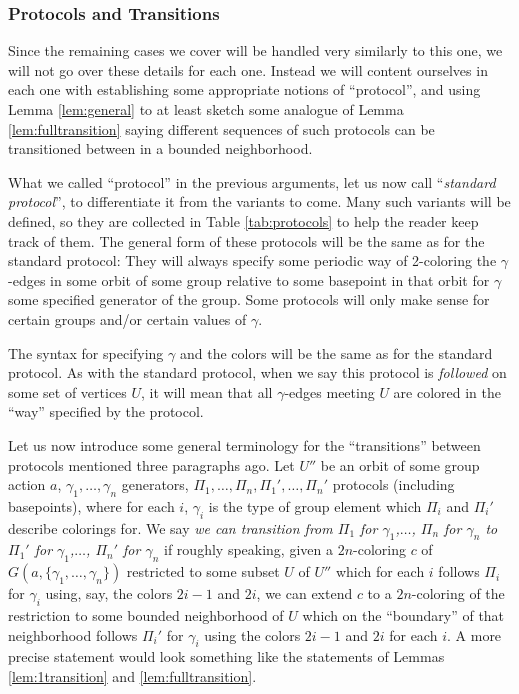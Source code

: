 \documentclass[12pt]{article}
\newcommand{\0}{\varnothing}
\begin{document}
\subsubsection{Protocols and Transitions}\label{subsubsec:pro}

Since the remaining cases we cover will be handled very similarly to this one, we will not go over these details for each one. Instead we will content ourselves in each one with establishing some appropriate notions of ``protocol'', and using Lemma \ref{lem:general} to at least sketch some analogue of Lemma \ref{lem:fulltransition} saying different sequences of such protocols can be transitioned between in a bounded neighborhood. 

What we called ``protocol'' in the previous arguments, let us now call ``\textit{standard protocol}'', to differentiate it from the variants to come. Many such variants will be defined, so they are collected in Table \ref{tab:protocols} to help the reader keep track of them. The general form of these protocols will be the same as for the standard protocol: They will always specify some periodic way of 2-coloring the $\gamma$-edges in some orbit of some group relative to some basepoint in that orbit for $\gamma$ some specified generator of the group. Some protocols will only make sense for certain groups and/or certain values of $\gamma$.

The syntax for specifying $\gamma$ and the colors will be the same as for the standard protocol. As with the standard protocol, when we say this protocol is \textit{followed} on some set of vertices $U$, it will mean that all $\gamma$-edges meeting $U$ are colored in the ``way'' specified by the protocol.

Let us now introduce some general terminology for the ``transitions'' between protocols mentioned three paragraphs ago. Let $U''$ be an orbit of some group action $a$, $\gamma_1,\ldots,\gamma_n$ generators, $\Pi_1,\ldots,\Pi_n, \Pi_1',\ldots,\Pi_n'$ protocols (including basepoints), where for each $i$, $\gamma_i$ is the type of group element which $\Pi_i$ and $\Pi_i'$ describe colorings for. We say \textit{we can transition from $\Pi_1$ for $\gamma_1$,$\ldots$, $\Pi_n$ for $\gamma_n$ to $\Pi_1'$ for $\gamma_1$,$\ldots$, $\Pi_n'$ for $\gamma_n$} if roughly speaking, given a $2n$-coloring $c$ of $G(a,\{\gamma_1,\ldots,\gamma_n\})$ restricted to some subset $U$ of $U''$ which for each $i$ follows $\Pi_i$ for $\gamma_i$ using, say, the colors $2i-1$ and $2i$, we can extend $c$ to a $2n$-coloring of the restriction to some bounded neighborhood of $U$ which on the ``boundary'' of that neighborhood follows $\Pi_i'$ for $\gamma_i$ using the colors $2i-1$ and $2i$ for each $i$. A more precise statement would look something like the statements of Lemmas \ref{lem:1transition} and \ref{lem:fulltransition}.
\end{document}
